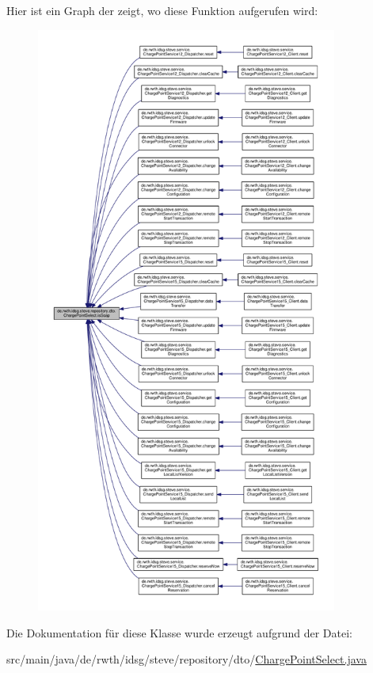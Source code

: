 Hier ist ein Graph der zeigt, wo diese Funktion aufgerufen wird\-:\nopagebreak
\begin{figure}[H]
\begin{center}
\leavevmode
\includegraphics[height=550pt]{classde_1_1rwth_1_1idsg_1_1steve_1_1repository_1_1dto_1_1_charge_point_select_abc2c6a1b288106f9a82dd089df66b6f7_icgraph}
\end{center}
\end{figure}




Die Dokumentation für diese Klasse wurde erzeugt aufgrund der Datei\-:\begin{DoxyCompactItemize}
\item 
src/main/java/de/rwth/idsg/steve/repository/dto/\hyperlink{_charge_point_select_8java}{Charge\-Point\-Select.\-java}\end{DoxyCompactItemize}
